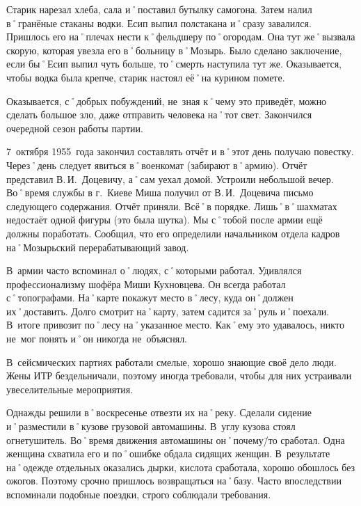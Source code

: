 Старик нарезал хлеба, сала и˚поставил бутылку самогона. Затем налил в˚гранёные стаканы водки. Есип выпил полстакана и˚сразу завалился. Пришлось его на˚плечах нести к˚фельдшеру по˚огородам. Она тут же˚вызвала скорую, которая увезла его в˚больницу в˚Мозырь. Было сделано заключение, если бы˚Есип выпил чуть больше, то˚смерть наступила тут же. Оказывается, чтобы водка была крепче, старик настоял её˚на курином помете.

Оказывается, с˚добрых побуждений, не~зная к˚чему это приведёт, можно сделать большое зло, даже отправить человека на˚тот свет. Закончился очередной сезон работы партии.

7~октября 1955~года закончил составлять отчёт и в˚этот день получаю повестку. Через˚день следует явиться в˚военкомат (забирают в˚армию). Отчёт представил В.\,И.~Доцевичу, а˚сам уехал домой. Устроили небольшой вечер. Во˚время службы в г.~Киеве Миша получил от В.\,И.~Доцевича письмо следующего содержания. Отчёт приняли. Всё˚в порядке. Лишь˚в˚шахматах недостаёт одной фигуры (это была шутка). Мы с˚тобой после армии ещё должны поработать. Сообщил, что его определили начальником отдела кадров на˚Мозырьский перерабатывающий завод.

В~армии часто вспоминал о˚людях, с˚которыми работал. Удивлялся профессионализму шофёра Миши Кухновцева. Он всегда работал с˚топографами. На˚карте покажут место в˚лесу, куда он˚должен их˚доставить. Долго смотрит на˚карту, затем садится за˚руль и˚поехали. В~итоге привозит по˚лесу на˚указанное место. Как˚ему это удавалось, никто не~мог понять и˚он никогда не~объяснял.

В~сейсмических партиях работали смелые, хорошо знающие своё дело люди. Жены ИТР бездельничали, поэтому иногда требовали, чтобы для них устраивали увеселительные мероприятия.

Однажды решили в˚воскресенье отвезти их на˚реку. Сделали сидение и˚разместили в˚кузове грузовой автомашины. В~углу кузова стоял огнетушитель. Во˚время движения автомашины он˚почему\=/то сработал. Одна женщина схватила его и по˚ошибке обдала сидящих женщин. В~результате на˚одежде отдельных оказались дырки, кислота сработала, хорошо обошлось без ожогов. Поэтому срочно пришлось возвращаться на˚базу. Часто впоследствии вспоминали подобные поездки, строго соблюдали требования.